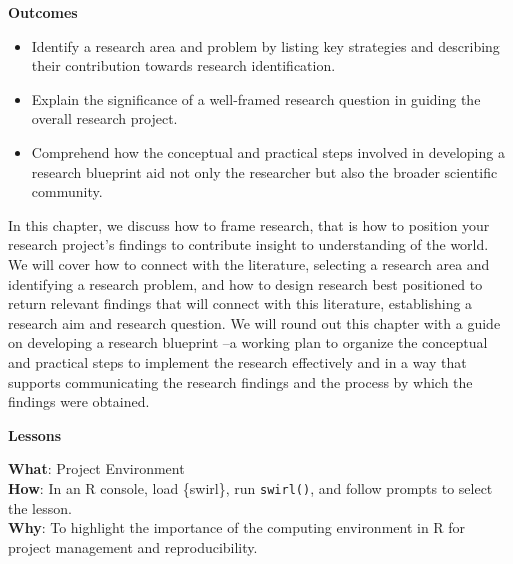 \documentclass[
  letterpaper,
]{latex/krantz}
\providecommand{\tightlist}{%
  \setlength{\itemsep}{0pt}\setlength{\parskip}{0pt}}\usepackage{longtable,booktabs,array}
\theoremstyle{definition}
\theoremstyle{remark}
\begin{document}
\begin{tcolorbox}[enhanced jigsaw, colback=white, opacityback=0, bottomrule=.15mm, rightrule=.15mm, breakable, left=2mm, arc=.35mm, colframe=quarto-callout-color-frame, leftrule=.75mm, toprule=.15mm]

\textbf{ Outcomes}

\begin{itemize}
\tightlist
\item
  Identify a research area and problem by listing key strategies and
  describing their contribution towards research identification.
\item
  Explain the significance of a well-framed research question in guiding
  the overall research project.
\item
  Comprehend how the conceptual and practical steps involved in
  developing a research blueprint aid not only the researcher but also
  the broader scientific community.
\end{itemize}

\end{tcolorbox}

In this chapter, we discuss how to frame research, that is how to
position your research project's findings to contribute insight to
understanding of the world. We will cover how to connect with the
literature, selecting a research area and identifying a research
problem, and how to design research best positioned to return relevant
findings that will connect with this literature, establishing a research
aim and research question. We will round out this chapter with a guide
on developing a research blueprint --a working plan to organize the
conceptual and practical steps to implement the research effectively and
in a way that supports communicating the research findings and the
process by which the findings were obtained.

\begin{tcolorbox}[enhanced jigsaw, colback=white, opacityback=0, bottomrule=.15mm, rightrule=.15mm, breakable, left=2mm, arc=.35mm, colframe=quarto-callout-color-frame, leftrule=.75mm, toprule=.15mm]

\textbf{ Lessons}

\textbf{What}: Project Environment\\
\textbf{How}: In an R console, load \{swirl\}, run \texttt{swirl()}, and
follow prompts to select the lesson.\\
\textbf{Why}: To highlight the importance of the computing environment
in R for project management and reproducibility.

\end{tcolorbox}
\end{document}

